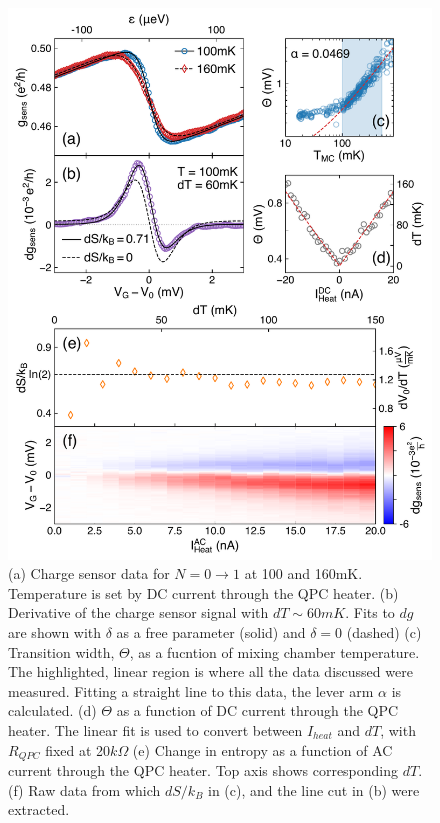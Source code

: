 \documentclass[twocolumn,showpacs,preprintnumbers,amsmath,amssymb,pra,aps,superscriptaddress]{revtex4-1}
\begin{document}
\begin{figure}[!]
        \includegraphics[width=1.0\columnwidth]{../figures/figure_2.pdf}
        \caption{\label{fig:fig2}(a) Charge sensor data for $N=0 \rightarrow 1$ at 100 and 160mK. Temperature is set by DC current through the QPC heater. (b) Derivative of the charge sensor signal with $dT \sim 60mK$. Fits to $dg$ are shown with $\delta$ as a free parameter (solid) and $\delta=0$ (dashed) (c) Transition width, $\Theta$, as a fucntion of mixing chamber temperature. The highlighted, linear region is where all the data discussed were measured. Fitting a straight line to this data, the lever arm $\alpha$ is calculated. (d) $\Theta$ as a function of DC current through the QPC heater. The linear fit is used to convert between $I_{heat}$ and $dT$, with $R_{QPC}$ fixed at 20$k\Omega$ (e) Change in entropy as a function of AC current through the QPC heater. Top axis shows corresponding $dT$. (f) Raw data from which $dS / k_B$ in (c), and the line cut in (b) were extracted.}
\end{figure}
\end{document}
